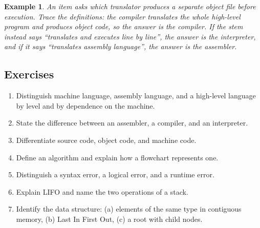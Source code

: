 \documentclass[11pt]{article}
\newtheorem{example}{Example}[section]
\begin{document}
\begin{example}
An item asks which translator produces a separate object file before
execution. Trace the definitions: the compiler translates the whole
high-level program and produces object code, so the answer is the compiler. If
the stem instead says ``translates and executes line by line'', the answer is
the interpreter, and if it says ``translates assembly language'', the answer
is the assembler.
\end{example}

\subsection*{Exercises}
\begin{enumerate}[label=\arabic*.]
  \item Distinguish machine language, assembly language, and a high-level
    language by level and by dependence on the machine.
  \item State the difference between an assembler, a compiler, and an
    interpreter.
  \item Differentiate source code, object code, and machine code.
  \item Define an algorithm and explain how a flowchart represents one.
  \item Distinguish a syntax error, a logical error, and a runtime error.
  \item Explain LIFO and name the two operations of a stack.
  \item Identify the data structure: (a) elements of the same type in
    contiguous memory, (b) Last In First Out, (c) a root with child nodes.
\end{enumerate}
\end{document}
